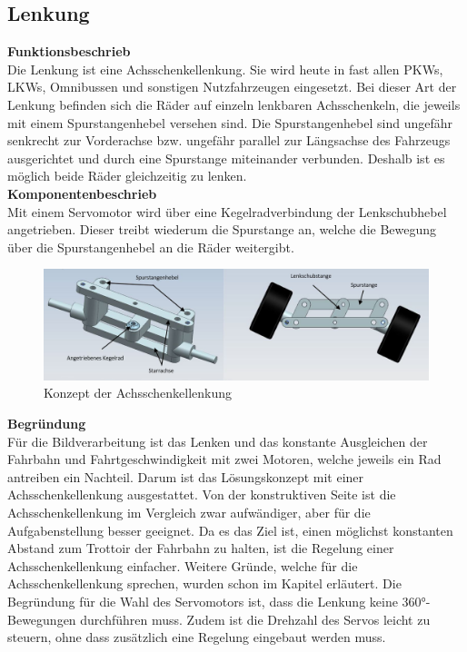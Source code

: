 \subsection{Lenkung}
\textbf{Funktionsbeschrieb}\\[0.2cm]
Die Lenkung ist eine Achsschenkellenkung. Sie wird heute in fast allen PKWs, LKWs, Omnibussen und sonstigen Nutzfahrzeugen eingesetzt. Bei dieser Art der Lenkung befinden sich die Räder auf einzeln lenkbaren Achsschenkeln, die jeweils mit einem Spurstangenhebel versehen sind. Die Spurstangenhebel sind ungefähr senkrecht zur Vorderachse bzw. ungefähr parallel zur Längsachse des Fahrzeugs ausgerichtet und durch eine Spurstange miteinander verbunden. Deshalb ist es möglich beide Räder gleichzeitig zu lenken.\\[0.2cm]
\textbf{Komponentenbeschrieb}\\[0.2cm]
Mit einem Servomotor wird über eine Kegelradverbindung der Lenkschubhebel angetrieben. Dieser treibt wiederum die Spurstange an, welche die Bewegung über die Spurstangenhebel an die Räder weitergibt.
\begin{figure}[H]%
\centering
\includegraphics[width=1\textwidth]{03_Loesungskonzept/pictures/Achsschenkellenkung.png}
\caption{Konzept der Achsschenkellenkung}
\label{fig:activityRoute}
\end{figure}
\textbf{Begründung}\\[0.2cm]
Für die Bildverarbeitung ist das Lenken und das konstante Ausgleichen der Fahrbahn und Fahrtgeschwindigkeit mit zwei Motoren, welche jeweils ein Rad antreiben ein Nachteil. Darum ist das Lösungskonzept mit einer Achsschenkellenkung ausgestattet. Von der konstruktiven Seite ist die Achsschenkellenkung im Vergleich zwar aufwändiger, aber für die Aufgabenstellung besser geeignet. Da es das Ziel ist, einen möglichst konstanten Abstand zum Trottoir der Fahrbahn zu halten, ist die Regelung einer Achsschenkellenkung einfacher. Weitere Gründe, welche für die Achsschenkellenkung sprechen, wurden schon im Kapitel \grqq{} erläutert.
Die Begründung für die Wahl des Servomotors ist, dass die Lenkung keine 360°-Bewegungen durchführen muss. Zudem ist die Drehzahl des Servos leicht zu steuern, ohne dass zusätzlich eine Regelung eingebaut werden muss. \\[0.2cm]
